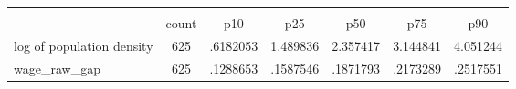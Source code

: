 \begin{tabular}{l*{1}{cccccc}} \hline\hline
                    &\multicolumn{6}{c}{}                                                         \\
                    &       count&         p10&         p25&         p50&         p75&         p90\\
\hline
log of population density&         625&    .6182053&    1.489836&    2.357417&    3.144841&    4.051244\\
wage\_raw\_gap        &         625&    .1288653&    .1587546&    .1871793&    .2173289&    .2517551\\
\hline\hline
\end{tabular}
